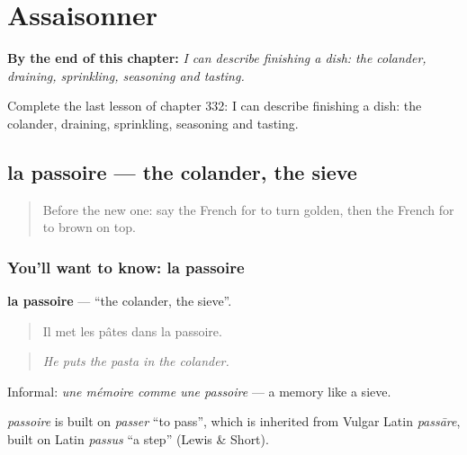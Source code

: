
\chapter{Assaisonner}
\label{ch:fr-assaisonner}

\begin{chapteropening}
\textbf{By the end of this chapter:} \emph{I can describe finishing a dish: the colander, draining, sprinkling, seasoning and tasting.}

Complete the last lesson of chapter 332: I can describe finishing a dish: the colander, draining, sprinkling, seasoning and tasting.
\end{chapteropening}

\section[la passoire]{la passoire — the colander, the sieve}

\label{lesson:FR-C332-passoire}



\begin{quote}
Before the new one: say the French for to turn golden, then the French for to brown on top.
\end{quote}

\subsection*{You'll want to know: la passoire}
\textbf{la passoire} — \textquotedblleft{}the colander, the sieve\textquotedblright{}.

\begin{quote}
Il met les pâtes dans la passoire.
\end{quote}

\begin{quote}
\emph{He puts the pasta in the colander.}
\end{quote}

Informal: \emph{une mémoire comme une passoire} — a memory like a sieve.

\begin{cousinweb}
\emph{passoire} is built on \emph{passer} \textquotedblleft{}to pass\textquotedblright{}, which is inherited from Vulgar Latin \emph{passāre}, built on Latin \emph{passus} \textquotedblleft{}a step\textquotedblright{} (Lewis \& Short).
\end{cousinweb}

